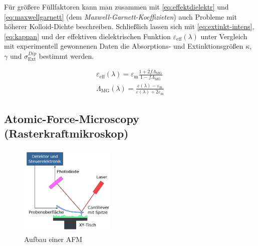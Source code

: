 \documentclass[numbers=noenddot,a4paper,notitlepage,twoside,BCOR15mm]{scrartcl}
\newcommand{\ix}[1]{_\text{#1}}
\newcommand{\tilt}[1]{\textit{#1}}
\begin{document}
			Für größere Füllfaktoren kann man zusammen mit \autoref{eq:effektdielektr} und \autoref{eq:maxwellgarnett} (dem \tilt{Maxwell-Garnett-Koeffizieten}) auch Probleme mit höherer Kolloid-Dichte beschreiben. Schließlich lassen sich mit \autoref{eq:extinkt-intens}, \autoref{eq:kappan} und der effektiven dielektrischen Funktion $\varepsilon\ix{eff}\left(\lambda\right)$ unter Vergleich mit experimentell gewonnenen Daten die Absorptions- und Extinktionsgrößen $\kappa$, $\gamma$ und $\sigma\ix{Ext}^{Dip}$ bestimmt werden.

				\begin{align}
					\varepsilon\ix{eff}\left(\lambda\right)=\varepsilon\ix{m}\frac{1+2f\Lambda\ix{MG}}{1-f\Lambda\ix{MG}} \label{eq:effektdielektr}\\
					\Lambda\ix{MG}\left(\lambda\right)=\frac{\varepsilon\left(\lambda\right)-\varepsilon\ix{m}}{\varepsilon\left(\lambda\right)+2\varepsilon\ix{m}} \label{eq:maxwellgarnett}
				\end{align}


		\subsection{Atomic-Force-Microscopy (Rasterkraftmikroskop)}\label{subsec:afm}

				\begin{figure}
					\centering
					\includegraphics[width=0.4\textwidth]{Atomic_force_microscope_block_diagram_(de).png}
					\caption{Aufbau einer AFM \cite{Wiki:AFM}}
				\end{figure}
\end{document}
